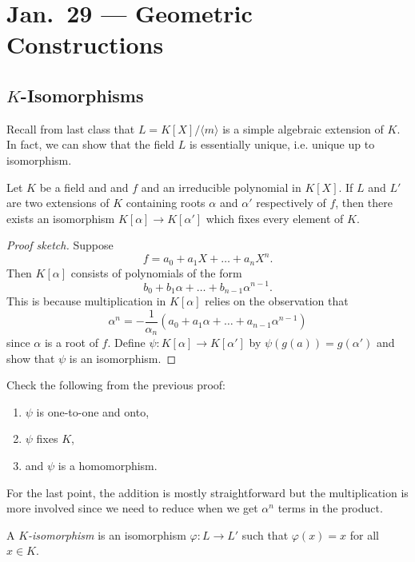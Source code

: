 \chapter{Jan.~29 --- Geometric Constructions}

\section{\texorpdfstring{$K$-Isomorphisms}{K-Isomorphisms}}
Recall from last class that $L = K[X] / \langle m \rangle$
is a simple algebraic extension of $K$. In fact, we
can show that the field $L$ is essentially unique,
i.e. unique up to isomorphism.
\begin{theorem}
  Let $K$ be a field and and $f$ and an irreducible
  polynomial in $K[X]$. If $L$ and $L'$ are two extensions
  of $K$ containing roots $\alpha$ and $\alpha'$
  respectively of $f$, then there exists an isomorphism
  $K[\alpha] \to K[\alpha']$ which fixes every element
  of $K$.
\end{theorem}

\begin{proof}[Proof sketch]
  Suppose
  \[
    f = a_0 + a_1 X + \dots + a_n X^n.
  \]
  Then $K[\alpha]$ consists of polynomials of the form
  \[
    b_0 + b_1 \alpha + \dots + b_{n-1} \alpha^{n-1}.
  \]
  This is because multiplication in $K[\alpha]$ relies on
  the observation that
  \[
    \alpha^n = -\frac{1}{\alpha_n} (a_0 + a_1 \alpha + \dots + a_{n-1} \alpha^{n-1})
  \]
  since $\alpha$ is a root of $f$. Define
  $\psi : K[\alpha] \to K[\alpha']$ by
  $\psi(g(a)) = g(\alpha')$ and show that $\psi$
  is an isomorphism.
\end{proof}

\begin{exercise}
  Check the following from the previous proof:
  \begin{enumerate}
    \item $\psi$ is one-to-one and onto,
    \item $\psi$ fixes $K$,
    \item and $\psi$ is a homomorphism.
  \end{enumerate}
  For the last point, the addition is mostly
  straightforward
  but the multiplication is more involved since
  we need to reduce when we get $\alpha^n$ terms
  in the product.
\end{exercise}

\begin{definition}
  A \emph{$K$-isomorphism} is an isomorphism
  $\varphi : L \to L'$
  such that $\varphi(x) = x$ for all $x \in K$.
\end{definition}

